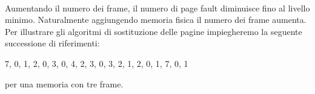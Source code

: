 \documentclass{article}
\begin{document}
				\begin{figure}[ht!]
				\end{figure}
				\\Aumentando il numero dei frame, il numero di page fault diminuisce fino al livello minimo. Naturalmente aggiungendo memoria fisica il numero dei frame aumenta.
				\\Per illustrare gli algoritmi di sostituzione delle pagine impiegheremo la seguente successione di riferimenti:
				\begin{center}
					7, 0, 1, 2, 0, 3, 0, 4, 2, 3, 0, 3, 2, 1, 2, 0, 1, 7, 0, 1
				\end{center}
				per una memoria con tre frame.
\end{document}
